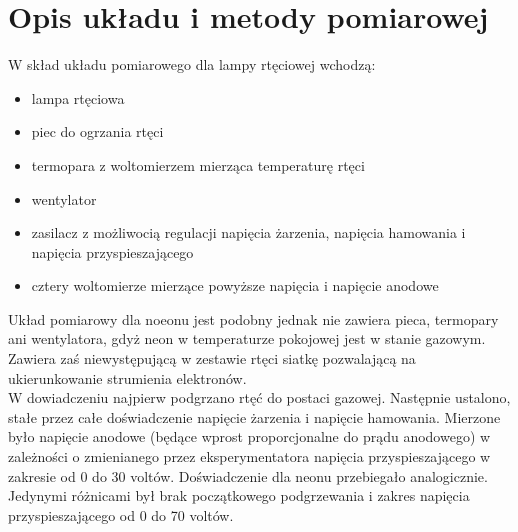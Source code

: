 \documentclass[a4paper,10pt]{article}
\begin{document}
\section{Opis układu i metody pomiarowej}
W skład układu pomiarowego dla lampy rtęciowej wchodzą:
\begin{itemize}
  \item lampa rtęciowa
  \item piec do ogrzania rtęci
  \item termopara z woltomierzem mierząca temperaturę rtęci
  \item wentylator
  \item zasilacz z możliwocią regulacji napięcia żarzenia, napięcia hamowania i napięcia przyspieszającego
  \item cztery woltomierze mierzące powyższe napięcia i napięcie anodowe
\end{itemize}
Układ pomiarowy dla noeonu jest podobny jednak nie zawiera pieca, termopary ani wentylatora, gdyż neon w temperaturze pokojowej jest w stanie gazowym. Zawiera zaś niewystępującą w
zestawie rtęci siatkę pozwalającą na ukierunkowanie strumienia elektronów.\\
W dowiadczeniu najpierw podgrzano rtęć do postaci gazowej. Następnie ustalono, stałe przez całe doświadczenie napięcie żarzenia i napięcie hamowania. Mierzone było napięcie
anodowe (będące wprost proporcjonalne do prądu anodowego) w zależności o zmienianego przez eksperymentatora napięcia przyspieszającego w zakresie od 0 do 30 voltów. Doświadczenie
dla neonu przebiegało analogicznie. Jedynymi różnicami był brak początkowego podgrzewania i zakres napięcia przyspieszającego od 0 do 70 voltów.
\end{document}
